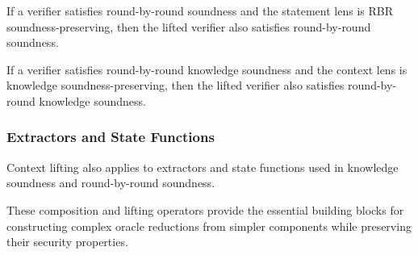 \begin{theorem}
    \label{thm:lift_context_rbr_soundness}
    If a verifier satisfies round-by-round soundness and the statement lens is RBR soundness-preserving, then the lifted verifier also satisfies round-by-round soundness.
\end{theorem}

\begin{theorem}
    \label{thm:lift_context_rbr_knowledge_soundness}
    If a verifier satisfies round-by-round knowledge soundness and the context lens is knowledge soundness-preserving, then the lifted verifier also satisfies round-by-round knowledge soundness.
\end{theorem}

\subsubsection{Extractors and State Functions}

Context lifting also applies to extractors and state functions used in knowledge soundness and round-by-round soundness.

\begin{definition}
    \label{def:straightline_extractor_lift_context}
\end{definition}

\begin{definition}
    \label{def:rbr_extractor_lift_context}
\end{definition}

\begin{definition}
    \label{def:state_function_lift_context}
\end{definition}

These composition and lifting operators provide the essential building blocks for constructing complex oracle reductions from simpler components while preserving their security properties.

